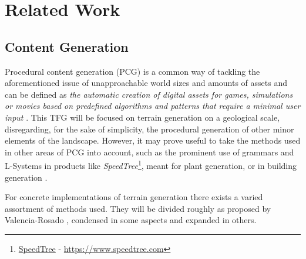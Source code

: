 
\cleardoublepage
\chapter{Related Work} \label{chap:Related_Work}


\section{Content Generation}
Procedural content generation (PCG) \cite{Maleki:2024:PCG} is a common way of tackling the aforementioned issue of unapproachable world sizes and amounts of assets and can be defined as \textit{the automatic creation of digital assets for games,
simulations or movies based on predefined algorithms and patterns that require a minimal user input} \cite{Freiknecht:2017:SPG}.
This TFG will be focused on terrain generation on a geological scale, disregarding, for the sake of simplicity, the procedural generation of other minor elements of the landscape. 
However, it may prove useful to take the methods used in other areas of PCG into account, such as the prominent use of grammars and L-Systems in products like \textit{SpeedTree}\footnote{\href{https://www.speedtree.com}{SpeedTree} - \url{https://www.speedtree.com}}, meant for plant generation, or in building generation \cite{Muller:2006:PMB}.

For concrete implementations of terrain generation there exists a varied assortment of methods used. They will be divided roughly as proposed by Valencia-Rosado \cite{Valencia-Rosado:2019:MPT}, condensed in some aspects and expanded in others.

